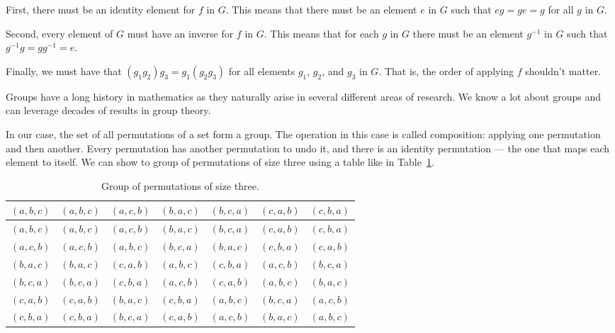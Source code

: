 \documentclass{iansnotes}
\begin{document}
  First, there must be an identity element for $f$ in $G$.
  This means that there must be an element $e$ in $G$ such that $eg = ge = g$ for all $g$ in $G$.
  
  Second, every element of $G$ must have an inverse for $f$ in $G$.
  This means that for each $g$ in $G$ there must be an element $g^{-1}$ in $G$ such that $g^{-1}g = gg^{-1} = e$.

  Finally, we must have that $(g_1 g_2)g_3 = g_1 (g_2 g_3)$ for all elements $g_1$, $g_2$, and $g_3$ in $G$.
  That is, the order of applying $f$ shouldn't matter.

  Groups have a long history in mathematics as they naturally arise in several different areas of research.
  We know a lot about groups and can leverage decades of results in group theory.

  In our case, the set of all permutations of a set form a group.
  The operation in this case is called composition: applying one permutation and then another.
  Every permutation has another permutation to undo it, and there is an identity permutation --- the one that maps each element to itself.
  We can show to group of permutations of size three using a table like in Table~\ref{table:group}.
  
  \begin{table}
    \centering
    \begin{tabular}{c|cccccc}
      $(a,b,c)$ & $(a,b,c)$ & $(a,c,b)$ & $(b,a,c)$ & $(b,c,a)$ & $(c,a,b)$ & $(c,b,a)$ \\
      \midrule
      $(a,b,c)$ & $(a,b,c)$ & $(a,c,b)$ & $(b,a,c)$ & $(b,c,a)$ & $(c,a,b)$ & $(c,b,a)$ \\
      $(a,c,b)$ & $(a,c,b)$ & $(a,b,c)$ & $(b,c,a)$ & $(b,a,c)$ & $(c,b,a)$ & $(c,a,b)$ \\
      $(b,a,c)$ & $(b,a,c)$ & $(c,a,b)$ & $(a,b,c)$ & $(c,b,a)$ & $(a,c,b)$ & $(b,c,a)$ \\
      $(b,c,a)$ & $(b,c,a)$ & $(c,b,a)$ & $(a,c,b)$ & $(c,a,b)$ & $(a,b,c)$ & $(b,a,c)$ \\
      $(c,a,b)$ & $(c,a,b)$ & $(b,a,c)$ & $(c,b,a)$ & $(a,b,c)$ & $(b,c,a)$ & $(a,c,b)$ \\
      $(c,b,a)$ & $(c,b,a)$ & $(b,c,a)$ & $(c,a,b)$ & $(a,c,b)$ & $(b,a,c)$ & $(a,b,c)$ \\
    \end{tabular}
    \caption{Group of permutations of size three.}
    \label{table:group}
  \end{table}
  \vspace{4mm}
\end{document}
